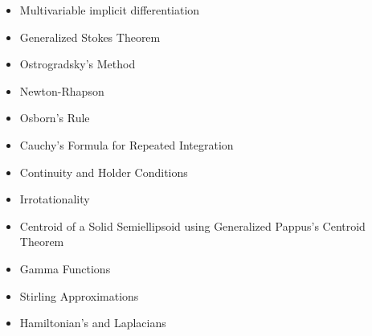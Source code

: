 \documentclass{article}
\begin{document}
\begin{itemize}
  \item Multivariable implicit differentiation
  \item Generalized Stokes Theorem
  \item Ostrogradsky's Method
  \item Newton-Rhapson
  \item Osborn's Rule
  \item Cauchy's Formula for Repeated Integration
  \item Continuity and Holder Conditions
  \item Irrotationality
  \item Centroid of a Solid Semiellipsoid using Generalized Pappus's Centroid Theorem
  \item Gamma Functions
  \item Stirling Approximations
  \item Hamiltonian's and Laplacians
\end{itemize}
\end{document}
